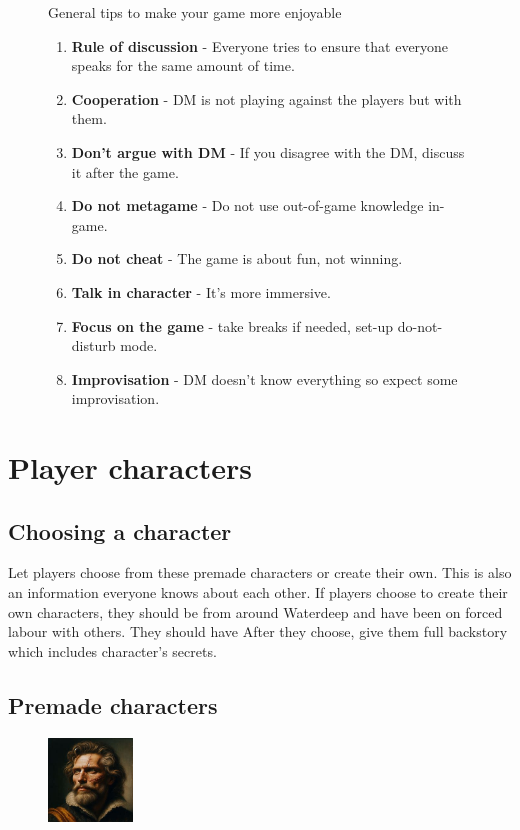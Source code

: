 \documentclass[10pt,twocolumn,twoside,openany,bg=full,layout=true,nomultitoc]{dndbook}
\begin{document}
\begin{figure}
\begin{DndComment}{General tips to make your game more enjoyable}
  \begin{enumerate}
    \item \textbf{Rule of discussion} - Everyone tries to ensure that everyone speaks for the same amount of time.
    \item \textbf{Cooperation} - DM is not playing against the players but with them.
    \item \textbf{Don't argue with DM} - If you disagree with the DM, discuss it after the game.
    \item \textbf{Do not metagame} - Do not use out-of-game knowledge in-game.
    \item \textbf{Do not cheat} - The game is about fun, not winning.
    \item \textbf{Talk in character} - It's more immersive.
    \item \textbf{Focus on the game} - take breaks if needed, set-up do-not-disturb mode.
    \item \textbf{Improvisation} - DM doesn't know everything so expect some improvisation.
  \end{enumerate}
  \end{DndComment}
\end{figure}

\newpage

\onecolumn

\chapter{Player characters}\label{ch:player-characters}
\section{Choosing a character}\label{sec:choosing-a-character}
Let players choose from these premade characters or create their own.
This is also an information everyone knows about each other.
If players choose to create their own characters, they should be from around Waterdeep and have been on forced labour with others.
They should have
After they choose, give them full backstory which includes character's secrets.


\newpage

  \section{Premade characters}\label{sec:premade-characters}
  \begin{figure}
    \begin{center}
      \includegraphics[width=0.2\textwidth]{img/harold}
    \end{center}
  \end{figure}
\end{document}
